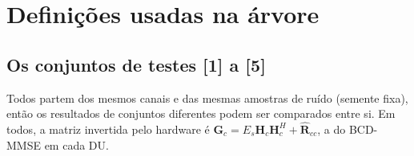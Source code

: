 \documentclass[11pt]{article}
\begin{document}


\clearpage
\section*{Definições usadas na árvore}

\subsection*{Os conjuntos de testes [1] a [5]}

Todos partem dos mesmos canais e das mesmas amostras de ruído (semente fixa), então os
resultados de conjuntos diferentes podem ser comparados entre si. Em todos, a matriz invertida
pelo hardware é $\mathbf G_c = E_s \mathbf H_c \mathbf H_c^H + \hat{\mathbf R}_{cc}$, a do
BCD-MMSE em cada DU.
\end{document}
